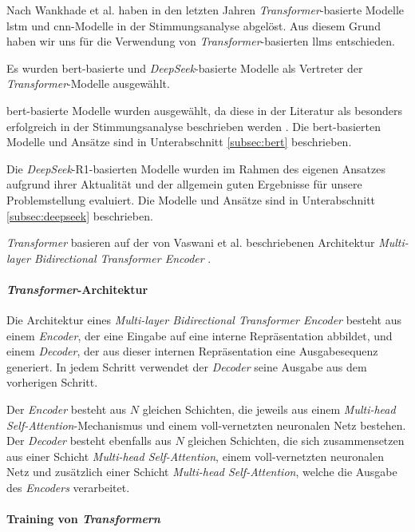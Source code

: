 Nach Wankhade et al. \cite{wankhade2022survey} haben in den letzten Jahren \textit{Transformer}-basierte Modelle \gls{lstm} und \gls{cnn}-Modelle in der Stimmungsanalyse abgelöst.
Aus diesem Grund haben wir uns für die Verwendung von \textit{Transformer}-basierten \glspl{llm} entschieden.

Es wurden \gls{bert}-basierte und \textit{DeepSeek}-basierte Modelle als Vertreter der \textit{Transformer}-Modelle ausgewählt.

\gls{bert}-basierte Modelle wurden ausgewählt, da diese in der Literatur als besonders erfolgreich in der Stimmungsanalyse beschrieben werden \cite{devlin2018bert}.
Die \gls{bert}-basierten Modelle und Ansätze sind in Unterabschnitt \ref{subsec:bert} beschrieben.

Die \textit{DeepSeek}-R1-basierten Modelle wurden im Rahmen des eigenen Ansatzes aufgrund ihrer Aktualität und der allgemein guten Ergebnisse für unsere Problemstellung evaluiert.
Die Modelle und Ansätze sind in Unterabschnitt \ref{subsec:deepseek} beschrieben.

\textit{Transformer} basieren auf der von Vaswani et al. beschriebenen Architektur \textit{Multi-layer Bidirectional Transformer Encoder} \cite{vaswani2017attention}.

\paragraph{\textit{Transformer}-Architektur}
Die Architektur eines \textit{Multi-layer Bidirectional Transformer Encoder} besteht aus einem \textit{Encoder}, der eine Eingabe auf eine interne Repräsentation abbildet, und einem \textit{Decoder}, der aus dieser internen Repräsentation eine Ausgabesequenz generiert.
In jedem Schritt verwendet der \textit{Decoder} seine Ausgabe aus dem vorherigen Schritt.

Der \textit{Encoder} besteht aus $N$ gleichen Schichten, die jeweils aus einem \textit{Multi-head Self-Attention}-Mechanismus und einem voll-vernetzten neuronalen Netz bestehen.
Der \textit{Decoder} besteht ebenfalls aus $N$ gleichen Schichten, die sich zusammensetzen aus einer Schicht \textit{Multi-head Self-Attention}, einem voll-vernetzten neuronalen Netz und zusätzlich einer Schicht \textit{Multi-head Self-Attention}, welche die Ausgabe des \textit{Encoders} verarbeitet.

\paragraph{Training von \textit{Transformern}}

